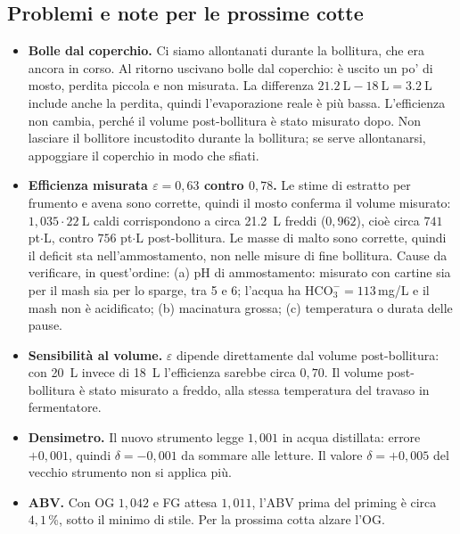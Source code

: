 \subsection*{Problemi e note per le prossime cotte}
\begin{itemize}
  \item \textbf{Bolle dal coperchio.} Ci siamo allontanati durante la bollitura, che era ancora in corso. Al ritorno uscivano bolle dal coperchio: è uscito un po' di mosto, perdita piccola e non misurata. La differenza $\SI{21,2}{\liter} - \SI{18}{\liter} = \SI{3,2}{\liter}$ include anche la perdita, quindi l'evaporazione reale è più bassa. L'efficienza non cambia, perché il volume post-bollitura è stato misurato dopo. Non lasciare il bollitore incustodito durante la bollitura; se serve allontanarsi, appoggiare il coperchio in modo che sfiati.
  \item \textbf{Efficienza misurata $\varepsilon = 0{,}63$ contro $0{,}78$.} Le stime di estratto per frumento e avena sono corrette, quindi il mosto conferma il volume misurato: $1{,}035 \cdot \SI{22}{\liter}$ caldi corrispondono a circa \SI{21,2}{\liter} freddi ($0{,}962$), cioè circa $741$ pt$\cdot$L, contro $756$ pt$\cdot$L post-bollitura. Le masse di malto sono corrette, quindi il deficit sta nell'ammostamento, non nelle misure di fine bollitura. Cause da verificare, in quest'ordine: (a) pH di ammostamento: misurato con cartine sia per il mash sia per lo sparge, tra 5 e 6; l'acqua ha $\mathrm{HCO_3^-} = 113$\,mg/L e il mash non è acidificato; (b) macinatura grossa; (c) temperatura o durata delle pause.
  \item \textbf{Sensibilità al volume.} $\varepsilon$ dipende direttamente dal volume post-bollitura: con \SI{20}{\liter} invece di \SI{18}{\liter} l'efficienza sarebbe circa $0{,}70$. Il volume post-bollitura è stato misurato a freddo, alla stessa temperatura del travaso in fermentatore.
  \item \textbf{Densimetro.} Il nuovo strumento legge $1{,}001$ in acqua distillata: errore $+0{,}001$, quindi $\delta = -0{,}001$ da sommare alle letture. Il valore $\delta = +0{,}005$ del vecchio strumento non si applica più.
  \item \textbf{ABV.} Con OG $1{,}042$ e FG attesa $1{,}011$, l'ABV prima del priming è circa $4{,}1$\,\%, sotto il minimo di stile. Per la prossima cotta alzare l'OG.
\end{itemize}

